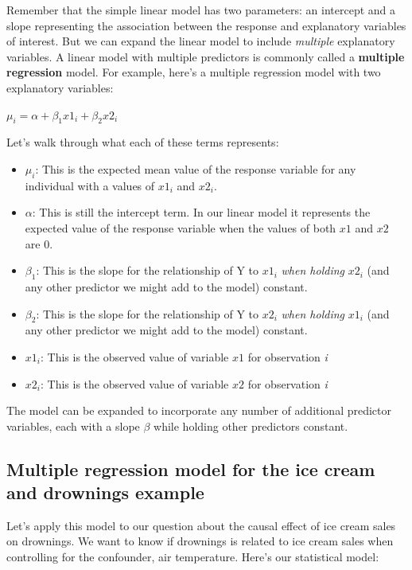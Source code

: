 \documentclass[
]{book}
\begin{document}
Remember that the simple linear model has two parameters: an intercept and a slope representing the association between the response and explanatory variables of interest. But we can expand the linear model to include \emph{multiple} explanatory variables. A linear model with multiple predictors is commonly called a \textbf{multiple regression} model. For example, here's a multiple regression model with two explanatory variables:

\(\mu_i = \alpha + \beta_1 x1_{i} + \beta_2 x2_{i}\)

Let's walk through what each of these terms represents:

\begin{itemize}
\item
  \(\mu_i\): This is the expected mean value of the response variable for any individual with a values of \(x1_{i}\) and \(x2_{i}\).
\item
  \(\alpha\): This is still the intercept term. In our linear model it represents the expected value of the response variable when the values of both \(x1\) and \(x2\) are 0.
\item
  \(\beta_1\): This is the slope for the relationship of Y to \(x1_{i}\) \emph{when holding} \(x2_{i}\) (and any other predictor we might add to the model) constant.
\item
  \(\beta_2\): This is the slope for the relationship of Y to \(x2_{i}\) \emph{when holding} \(x1_{i}\) (and any other predictor we might add to the model) constant.
\item
  \(x1_{i}\): This is the observed value of variable \(x1\) for observation \emph{i}
\item
  \(x2_{i}\): This is the observed value of variable \(x2\) for observation \emph{i}
\end{itemize}

The model can be expanded to incorporate any number of additional predictor variables, each with a slope \(\beta\) while holding other predictors constant.

\subsection{Multiple regression model for the ice cream and drownings example}\label{multiple-regression-model-for-the-ice-cream-and-drownings-example}

Let's apply this model to our question about the causal effect of ice cream sales on drownings. We want to know if drownings is related to ice cream sales when controlling for the confounder, air temperature. Here's our statistical model:
\end{document}
